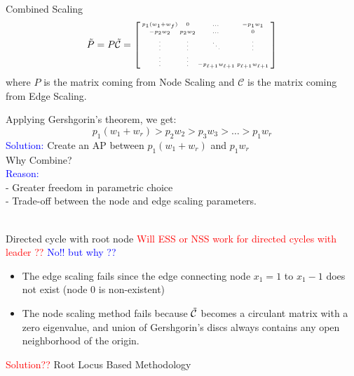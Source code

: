 \begin{subframe}\label{CombScal}
	\begin{block}{Combined Scaling}
		$$\Tilde{P}=P\Tilde{\mathcal{C}}=\tiny{\begin{bsmallmatrix}
				p_1(w_1+w_f)  &  0 & \dots & -p_1w_1 \\
				-p_2w_2 & p_2w_2 & \dots & 0 \\
				\vdots & \vdots  & \ddots & \vdots \\
				\vdots & \vdots  & -p_{\ell+1}w_{\ell+1} & p_{\ell+1}w_{\ell+1}
		\end{bsmallmatrix}}$$
		where $P$ is the matrix coming from Node Scaling and $\mathcal{C}$ is the matrix coming from Edge Scaling.\\
	\end{block}
	Applying Gershgorin's theorem, we get:\\
	$$p_1(w_1+w_r)>p_2w_2>p_3w_3>\dots>p_1w_r$$
	\textcolor{blue}{Solution: }Create an AP between $p_1(w_1+w_r)$ and $p_1w_r$\\
	\pause
	Why Combine?\\
	\pause
	\textcolor{blue}{Reason:\\ }
	- Greater freedom in parametric choice \\
	- Trade-off between the node and edge scaling parameters.\\
	~~\hyperlink{gersback}{}
\end{subframe}
	
	
\begin{subframe}{Directed cycle with root node}
	\textcolor{red}{Will ESS or NSS work for directed cycles with leader ??} \pause \textcolor{blue}{No!! but why ??}\\
	\begin{block}{}
		\begin{itemize}
			\item The edge scaling fails since the edge connecting node $x_1=1$ to $x_1-1$ does not exist (node $0$ is non-existent)
			\item The node scaling method fails because $\Tilde{\mathcal{C}}$ becomes a circulant matrix with a zero eigenvalue, and union of Gershgorin's discs always contains any open neighborhood of the origin.
		\end{itemize}
	\end{block}
	\pause
	\centering
	\textcolor{red}{Solution??} 
	Root Locus Based Methodology ~~\hyperlink{RLSimbase}{}
\end{subframe}


